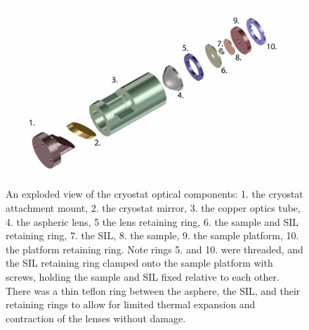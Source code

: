 \begin{figure}[h!]
\centering
\includegraphics[width = 1.1\textwidth]{Holder4.jpg}
\caption{ \doublespacing An exploded view of the cryostat optical components: 1. the cryostat attachment mount, 2. the cryostat mirror, 3. the copper optics tube, 4. the aspheric lens, 5 the lens retaining ring, 6. the sample and SIL retaining ring, 7. the SIL, 8. the sample, 9. the sample platform, 10. the platform retaining ring. Note rings 5. and 10. were threaded, and the SIL retaining ring clamped onto the sample platform with screws, holding the sample and SIL fixed relative to each other. There was a thin teflon ring between the asphere, the SIL, and their retaining rings to allow for limited thermal expansion and contraction of the lenses without damage.}
\label{mount}
\end{figure}

